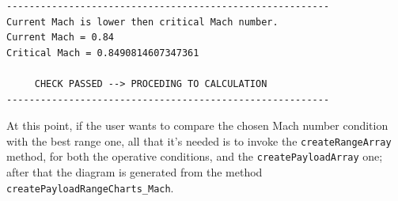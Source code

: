 \documentclass[a4paper,12pt,oneside]{book}
\begin{document}
\bigskip
\begin{lstlisting}[caption={Excerpt of the B747-100B Payload-Range test results - critical Mach number check}, captionpos=b, tabsize=2]
---------------------------------------------------------
Current Mach is lower then critical Mach number.
Current Mach = 0.84
Critical Mach = 0.8490814607347361

	 CHECK PASSED --> PROCEDING TO CALCULATION 
---------------------------------------------------------
\end{lstlisting}

\bigskip
At this point, if the user wants to compare the chosen Mach number condition with the best range one, all that it’s needed is to invoke the \lstinline[language=Java]!createRangeArray! method, for both the operative conditions, and the \lstinline[language=Java]!createPayloadArray! one; after that the diagram is generated from the method \lstinline[language=Java]!createPayloadRangeCharts_Mach!.
\end{document}
